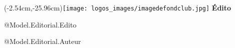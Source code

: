 ﻿\fancyput(-2.54cm,-25.96cm){\texttt{[image: logos\_images/imagedefondclub.jpg]}}%
{\Huge\sffamily\textbf{\textcolor{bleudvp}{Édito}}}\par\vspace{\baselineskip}

@Model.Editorial.Edito

\begin{flushright}
@Model.Editorial.Auteur
\end{flushright}
\clearpage